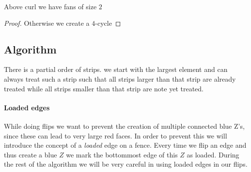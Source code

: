 \begin{lemma}
  \label{lm:}
  Above curl we have fans of size $2$
\end{lemma}
\begin{proof}
  Otherwise we create a $4$-cycle
\end{proof}


\subsection{Algorithm}
There is a partial order of strips. we start with the largest element and can always treat such a strip such that all strips larger than that strip are already treated while all strips smaller than that strip are note yet treated.

\paragraph{Loaded edges}
While doing flips we want to prevent the creation of multiple connected blue Z's, since these can lead to very large red faces. In order to prevent this we will introduce the concept of a \emph{loaded} edge on a fence. Every time we flip an edge and thus create a blue $Z$ we mark the bottommost edge of this $Z$ as loaded. During the rest of the algorithm we will be very careful in using loaded edges in our flips.

